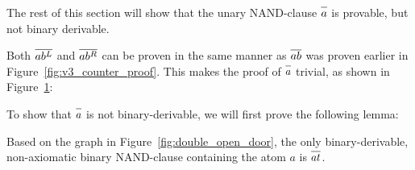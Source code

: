 The rest of this section will show that the unary NAND-clause $\ol{a}$ is provable, but not binary derivable.

Both $\ol{ab^L}$ and $\ol{ab^R}$ can be proven in the same manner as $\ol{ab}$ was proven earlier in Figure~\ref{fig:v3_counter_proof}.
This makes the proof of $\ol{a}$ trivial, as shown in Figure~\ref{fig:unary_nand_proof}:\par
\begin{figure}[!h]
  \centering
  \begin{prooftree*}
    \Hypo{\dots}
    \Hypo{\dots}
  \end{prooftree*}
  \caption{}
  \label{fig:unary_nand_proof}
\end{figure}
\FloatBarrier
To show that $\ol{a}$ is not binary-derivable, we will first prove the following lemma:
\begin{lemma}
  Based on the graph in Figure~\ref{fig:double_open_door}, the only binary-derivable, non-axiomatic binary NAND-clause containing the atom $a$ is $\ol{at}$.
\end{lemma}

